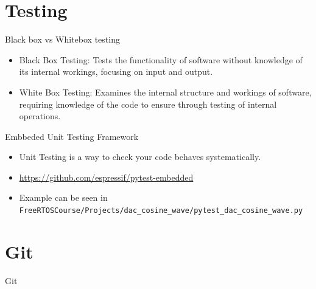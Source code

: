 \documentclass[10pt]{beamer}
\begin{document}
\section{Testing}
\begin{frame} {Black box vs Whitebox testing}
\begin{itemize}
  \item Black Box Testing: Tests the functionality of software without knowledge of its internal workings, focusing on input and output.
  \item White Box Testing: Examines the internal structure and workings of software, requiring knowledge of the code to ensure through testing of internal operations.
\end{itemize}
\end{frame}

\begin{frame} {Embbeded Unit Testing Framework}
  \begin{itemize} 
    \item Unit Testing is a way to check your code behaves systematically.
      \item \url{https://github.com/espressif/pytest-embedded}
      \item Example can be seen in \texttt{FreeRTOSCourse/Projects/dac\_cosine\_wave/pytest\_dac\_cosine\_wave.py}
  \end{itemize}
\end{frame}

\section{Git}
\begin{frame}{Git}
  
\end{frame}
\end{document}
